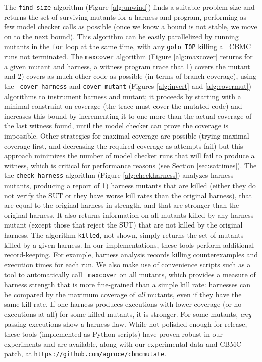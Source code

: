 \documentclass[conference]{IEEEtran}
\begin{document}
The {\tt find-size} algorithm (Figure \ref{alg:unwind}) finds a
suitable problem size and returns the set of surviving mutants for a
harness and program, performing as few model checker calls as possible
(once we know a bound is not stable, we move on to the next bound).
This algorithm can be easily parallelized by running mutants in the
{\tt for} loop at the same time, with any {\tt goto TOP} killing all
CBMC runs not terminated.  The {\tt maxcover} algorithm (Figure
\ref{alg:maxcover} returns for a given mutant and harness, a witness
program trace that 1) covers the mutant and 2) covers as much other
code as possible (in terms of branch coverage), using the {\tt
  cover-harness} and {\tt cover-mutant} (Figures \ref{alg:invert} and
\ref{alg:covermut}) algorithms to instrument harness and mutant; it
proceeds by starting with a minimal constraint on coverage (the trace
must cover the mutated code) and increases this bound by incrementing
it to one more than the actual coverage of the last witness found,
until the model checker can prove the coverage is impossible.  Other
strategies for maximal coverage are possible (trying maximal coverage
first, and decreasing the required coverage as attempts fail) but this
approach minimizes the number of model checker runs that will fail to
produce a witness, which is critical for performance reasons (see
Section \ref{sec:sattimes}).  The the {\tt check-harness} algorithm
(Figure \ref{alg:checkharness}) analyzes harness mutants, producing a
report of 1) harness mutants that are killed (either they do not
verify the SUT or they have worse kill rates than the original
harness), that are equal to the original harness in strength, and that
are stronger than the original harness.  It also returns information
on all mutants killed by any harness mutant (except those that reject
the SUT) that are not killed by the original harness.  The algorithm
{\tt killed}, not shown, simply returns the set of mutants killed by a
given harness.  In our implementations, these tools perform additional
record-keeping. For example, harness analysis records killing
counterexamples and execution times for each run.  We also make use of
convenience scripts such as a tool to automatically call {\tt
  maxcover} on all mutants, which provides a measure of harness
strength that is more fine-grained than a simple kill rate: harnesses
can be compared by the maximum coverage of \emph{all} mutants, even if
they have the same kill rate.  If one harness produces executions with
lower coverage (or no executions at all) for some killed mutants, it
is stronger.  For some mutants, \emph{any} passing executions show a
harness flaw. While not polished enough for release, these tools
(implemented as Python scripts) have proven robust in our experiments
and are available, along with our experimental data and CBMC patch, at
{\tt \url{https://github.com/agroce/cbmcmutate}}.
\end{document}
